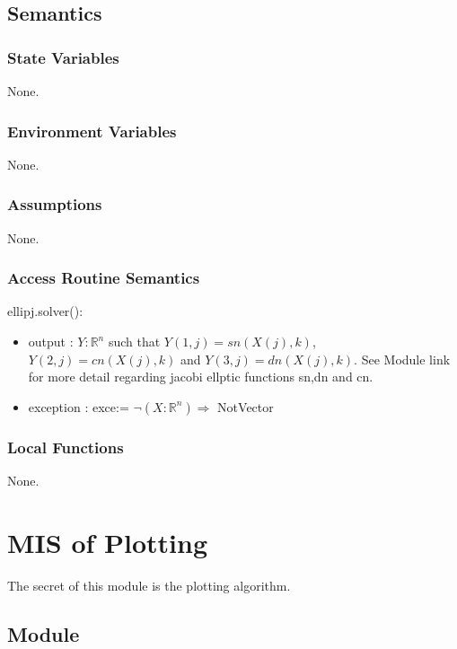 \documentclass[12pt, titlepage]{article}
\begin{document}
\subsection{Semantics}

\subsubsection{State Variables}

None.

\subsubsection{Environment Variables}

None.

\subsubsection{Assumptions}

None.

\subsubsection{Access Routine Semantics}

\noindent ellipj.solver():
\begin{itemize}
	\item output : $Y: \mathbb{R}^{n}$ such that $Y(1,j)= sn(X(j),k)$, 
	$Y(2,j)=cn(X(j),k)$ and $Y(3,j)=dn(X(j),k)$. See Module link for more 
	detail regarding jacobi ellptic functions sn,dn and cn. 
	\item exception : exce:= $\neg(X : \mathbb{R}^{n}) \Rightarrow$ 
	NotVector
\end{itemize} 

\subsubsection{Local Functions} 

None. 

\newpage 

\section{MIS of Plotting} \label{MPLT} 

The secret of this module is the plotting algorithm. 

\subsection{Module}
\end{document}
